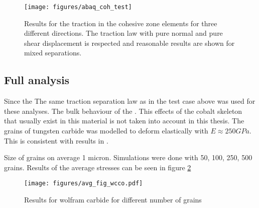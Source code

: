 \documentclass[wcco.tex]{subfiles}
\begin{document}
\begin{figure}[ht]
\centering
\texttt{[image: figures/abaq\_coh\_test]}
\caption{Results for the traction in the cohesive zone elements for three different directions. The traction law with pure normal and pure shear displacement is respected and reasonable results are shown for mixed separations. }
\label{fig:test_cases}
\end{figure}


\subsection{Full analysis}

Since the The same traction separation law as in the test case above was used for these analyses. The bulk behaviour of the .
This effects of the cobalt skeleton that usually exist in this material is not taken into account in this thesis. The grains of tungsten carbide was modelled to deform elastically with $E \approx 250GPa$. This is consistent with results in \cite{Buss04}.

Size of grains on average 1 micron. Simulations were done with 50, 100, 250, 500 grains. Results of the average stresses can be seen in figure \ref{fig:wcco_res}

\begin{figure}[ht]
\centering
\texttt{[image: figures/avg\_fig\_wcco.pdf]}
\caption{Results for wolfram carbide for different number of grains}
\label{fig:wcco_res}
\end{figure}
\end{document}
